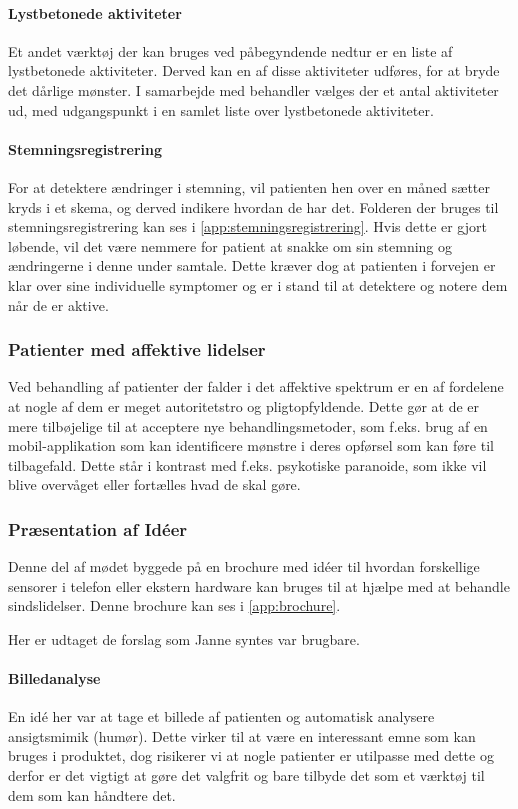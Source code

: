 \paragraph{Lystbetonede aktiviteter}
Et andet værktøj der kan bruges ved påbegyndende nedtur er en liste af lystbetonede aktiviteter.
Derved kan en af disse aktiviteter udføres, for at bryde det dårlige mønster.
I samarbejde med behandler vælges der et antal aktiviteter ud, med udgangspunkt i en samlet liste over lystbetonede aktiviteter.

\paragraph{Stemningsregistrering}
For at detektere ændringer i stemning, vil patienten hen over en måned sætter kryds i et skema, og derved indikere hvordan de har det.
Folderen der bruges til stemningsregistrering kan ses i \cref{app:stemningsregistrering}.
Hvis dette er gjort løbende, vil det være nemmere for patient at snakke om sin stemning og ændringerne i denne under samtale.
Dette kræver dog at patienten i forvejen er klar over sine individuelle symptomer og er i stand til at detektere og notere dem når de er aktive.

\subsubsection{Patienter med affektive lidelser}
Ved behandling af patienter der falder i det affektive spektrum er en af fordelene at nogle af dem er meget autoritetstro og pligtopfyldende.
Dette gør at de er mere tilbøjelige til at acceptere nye behandlingsmetoder, som f.eks. brug af en mobil-applikation som kan identificere mønstre i deres opførsel som kan føre til tilbagefald.
Dette står i kontrast med f.eks. psykotiske paranoide, som ikke vil blive overvåget eller fortælles hvad de skal gøre.

\subsubsection{Præsentation af Idéer}\label{janne_ideer}
Denne del af mødet byggede på en brochure med idéer til hvordan forskellige sensorer i telefon eller ekstern hardware kan bruges til at hjælpe med at behandle sindslidelser. 
Denne brochure kan ses i \cref{app:brochure}.

Her er udtaget de forslag som Janne syntes var brugbare.

\paragraph{Billedanalyse}
En idé her var at tage et billede af patienten og automatisk analysere ansigtsmimik (humør).
Dette virker til at være en interessant emne som kan bruges i produktet, dog risikerer vi at nogle patienter er utilpasse med dette og derfor er det vigtigt at gøre det valgfrit og bare tilbyde det som et værktøj til dem som kan håndtere det.

